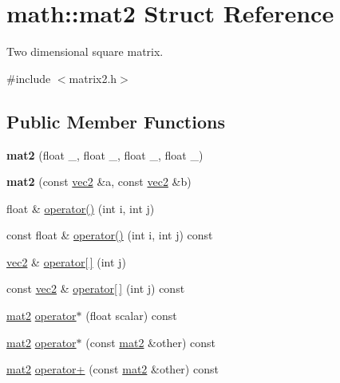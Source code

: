 \hypertarget{structmath_1_1mat2}{}\section{math\+:\+:mat2 Struct Reference}
\label{structmath_1_1mat2}


Two dimensional square matrix.  




{\ttfamily \#include $<$matrix2.\+h$>$}

\subsection*{Public Member Functions}
\begin{DoxyCompactItemize}
\item 
\mbox{\label{structmath_1_1mat2_a1ab77b33fecae29dc7167893616ac976}} 
{\bfseries mat2} (float \+\_, float \+\_, float \+\_, float \+\_)
\item 
\mbox{\label{structmath_1_1mat2_a27d9de18d87c6e3c9c6554e28ceb1609}} 
{\bfseries mat2} (const \hyperlink{structmath_1_1vec2}{vec2} \&a, const \hyperlink{structmath_1_1vec2}{vec2} \&b)
\item 
float \& \hyperlink{structmath_1_1mat2_a59d375076b3309ce5d0054c60a6f1530}{operator()} (int i, int j)
\item 
const float \& \hyperlink{structmath_1_1mat2_af7ba9cf2139642b4cdc7b9332797992b}{operator()} (int i, int j) const
\item 
\hyperlink{structmath_1_1vec2}{vec2} \& \hyperlink{structmath_1_1mat2_a551cb5e3066d2012a9efa3f78f261f4e}{operator\mbox{[}$\,$\mbox{]}} (int j)
\item 
const \hyperlink{structmath_1_1vec2}{vec2} \& \hyperlink{structmath_1_1mat2_ac3a7c6540e29afae00ed93c5c103d3a4}{operator\mbox{[}$\,$\mbox{]}} (int j) const
\item 
\hyperlink{structmath_1_1mat2}{mat2} \hyperlink{structmath_1_1mat2_a5971423e3b33e451df76e4a2a4e47e36}{operator$\ast$} (float scalar) const
\item 
\hyperlink{structmath_1_1mat2}{mat2} \hyperlink{structmath_1_1mat2_a57bfc3f0f7fdaf172fc6a4fab4b16bf2}{operator$\ast$} (const \hyperlink{structmath_1_1mat2}{mat2} \&other) const
\item 
\hyperlink{structmath_1_1mat2}{mat2} \hyperlink{structmath_1_1mat2_a59ef3a67aed221a0bb05c27accc83fec}{operator+} (const \hyperlink{structmath_1_1mat2}{mat2} \&other) const

\end{DoxyCompactItemize}

